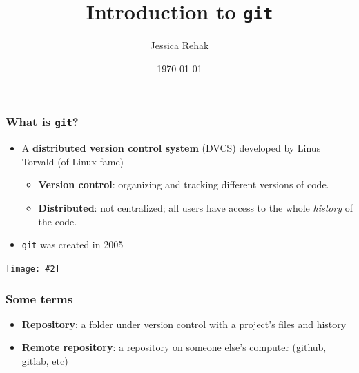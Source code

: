 \documentclass{beamer}
\title{Introduction to \texttt{git}}
\author{Jessica Rehak}
\date{\today}
\newcommand{\floatbox}[2]{
    \begin{tcolorbox}[beamer,
                  width=#1\textheight,
                  arc=0pt,
                  boxsep=0pt,
                  left=0pt,right=0pt,top=0pt,bottom=0pt,
                  ]
    \texttt{[image: \#2]}
    \end{tcolorbox}
}
\begin{document}
\begin{frame}
\titlepage
\end{frame}

\begin{frame}
    \frametitle{What is \texttt{git}?}
    \begin{itemize}
        \item A \textbf{distributed version control system} (DVCS) developed by Linus Torvald (of Linux fame)
        \begin{itemize}
            \item \textbf{Version control}: organizing and tracking different versions of code.
            \item \textbf{Distributed}: not centralized; all users have access to the whole \textit{history} of the code.
        \end{itemize}
        \item \texttt{git} was created in 2005
    \end{itemize}
    \centering
    \floatbox{0.8}{images/first_commit.png}
\end{frame}

\begin{frame}
\frametitle{Some terms}
\begin{itemize}
    \item \textbf{Repository}: a folder under version control with a project's files and history
    \item \textbf{Remote repository}: a repository on someone else's computer (github, gitlab, etc)
\end{itemize}
\end{frame}
\end{document}
